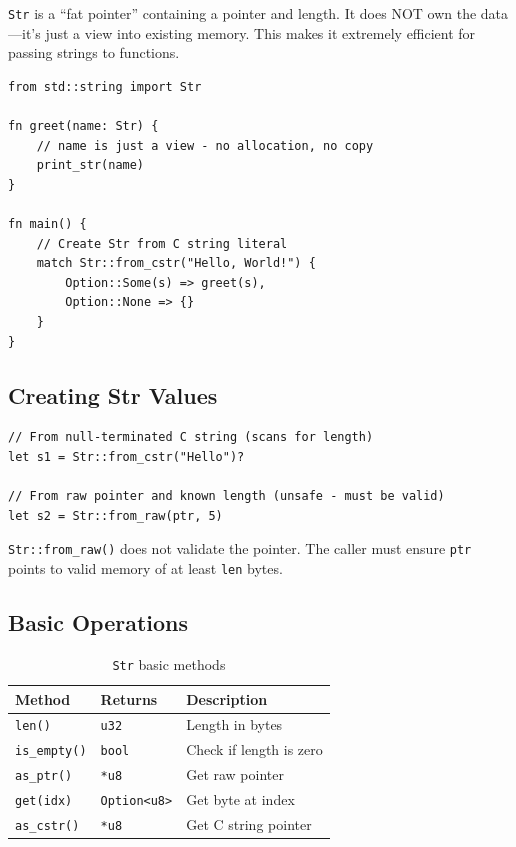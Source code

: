 \texttt{Str} is a ``fat pointer'' containing a pointer and length. It does NOT own the data---it's just a view into existing memory. This makes it extremely efficient for passing strings to functions.

\begin{lstlisting}
from std::string import Str

fn greet(name: Str) {
    // name is just a view - no allocation, no copy
    print_str(name)
}

fn main() {
    // Create Str from C string literal
    match Str::from_cstr("Hello, World!") {
        Option::Some(s) => greet(s),
        Option::None => {}
    }
}
\end{lstlisting}

\subsection{Creating Str Values}

\begin{lstlisting}
// From null-terminated C string (scans for length)
let s1 = Str::from_cstr("Hello")?

// From raw pointer and known length (unsafe - must be valid)
let s2 = Str::from_raw(ptr, 5)
\end{lstlisting}

\begin{warningbox}
\texttt{Str::from\_raw()} does not validate the pointer. The caller must ensure \texttt{ptr} points to valid memory of at least \texttt{len} bytes.
\end{warningbox}

\subsection{Basic Operations}

\begin{table}[h]
\centering
\begin{tabular}{lll}
\textbf{Method} & \textbf{Returns} & \textbf{Description} \\
\hline
\texttt{len()} & \texttt{u32} & Length in bytes \\
\texttt{is\_empty()} & \texttt{bool} & Check if length is zero \\
\texttt{as\_ptr()} & \texttt{*u8} & Get raw pointer \\
\texttt{get(idx)} & \texttt{Option<u8>} & Get byte at index \\
\texttt{as\_cstr()} & \texttt{*u8} & Get C string pointer \\
\end{tabular}
\caption{\texttt{Str} basic methods}
\end{table}


